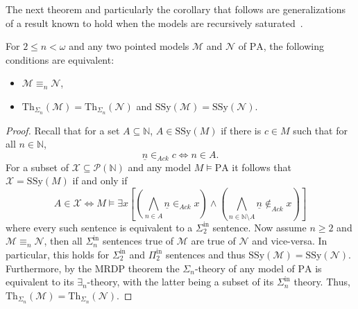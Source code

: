 \documentclass[11pt]{amsart}
\newcommand{\mc}[1]{\mathcal{#1}}
\newcommand{\Pinf}[1]{\Pi^{\mathrm{in}}_{#1}}
\newcommand{\Sinf}[1]{\Sigma^{\mathrm{in}}_{#1}}
\newcommand{\PA}{\mathrm{PA}}
\newcommand{\SSy}{\mathrm{SSy}}
\newcommand{\Th}{\mathrm{Th}}
\theoremstyle{remark}
\begin{document}
The next theorem and particularly the corollary that follows are generalizations of a result known to hold when the models are recursively saturated~\cite[Proposition 1.8.1]{KS}.
\begin{theorem} \label{thm:SsyEqn} 
    For $2 \le n < \omega$ and any two pointed models $\mathcal{M}$ and $\mathcal{N}$ of $\PA$, the following conditions are equivalent:
    \begin{itemize}
        \item $\mathcal{M} \equiv_{n} \mathcal{N}$,
        \item $\Th_{\Sigma_{n}}(\mathcal{M}) = \Th_{\Sigma_{n}}(\mathcal{N})$ and $\SSy(\mathcal{M}) = \SSy(\mathcal{N})$.
    \end{itemize}
\end{theorem}
\begin{proof}
    Recall that for a set $A \subseteq \mathbb{N}$, $A \in \SSy(M)$ if there is $c \in M$ such that for all $n \in \mathbb{N}$, \[\underline{n} \in_{Ack} c \iff n \in A.\] 
	For a subset of $\mathcal{X} \subseteq \mathcal{P}(\mathbb{N})$ and any model $M \models \PA$ it follows that $\mathcal{X} = \SSy(M)$ if and only if \[A \in \mathcal{X} \iff M \models \exists x \left[ \left( \bigwedge_{n \in A} \underline{n} \in_{Ack} x \right) \wedge \left( \bigwedge_{n \in \mathbb{N} \setminus A} \underline{n} \not\in_{Ack} x \right)\right]\] where every such sentence is equivalent to a $\Sinf{2}$ sentence. 
	Now assume $n\geq 2$ and $\mc{M} \equiv_n \mc{N}$, then all $\Sinf{n}$ sentences true of $\mc{M}$ are true of $\mc{N}$ and vice-versa. In particular, this holds for $\Sinf{2}$ and $\Pinf{2}$ sentences and thus $\SSy(\mc{M}) = \SSy(\mc{N})$. Furthermore, by the MRDP theorem the $\Sigma_n$-theory of any model of $\PA$ is equivalent to its $\exists_n$-theory, with the latter being a subset of its $\Sinf{n}$ theory. Thus, $\Th_{\Sigma_n}(\mc{M})=\Th_{\Sigma_n}(\mc{N})$.
    

\end{proof}
\end{document}
